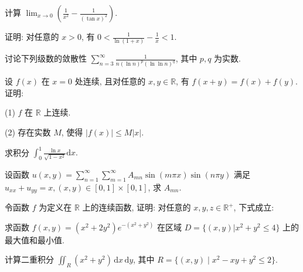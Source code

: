 计算 $\lim_{x\to 0}\left(\frac{1}{x^2} -\frac{1}{(\tan x)^2}\right)$.\par
证明: 对任意的 $x > 0$, 有 $0 < \frac{1}{\ln(1 + x)} - \frac{1}{x} < 1$.\par
讨论下列级数的敛散性 $\sum_{n=3}^{\infty} \frac{1}{n(\ln n)^p (\ln \ln n)^q}$, 其中 $p, q$ 为实数.\par
设 $f(x)$ 在 $x = 0$ 处连续, 且对任意的 $x, y \in \mathbb{R}$, 有 $f(x + y) = f(x) + f(y)$. 证明:\par
(1) $f$ 在 $\mathbb{R}$ 上连续.\par
(2) 存在实数 $M$, 使得 $|f(x)| \leq M|x|$.\par
求积分 $\int_0^1\frac{\ln x}{\sqrt{1 - x^2}}\mathrm{d}x.$\par
设函数 $u(x, y) = \sum_{n=1}^{\infty} \sum_{m=1}^{\infty} A_{mn} \sin(m\pi x) \sin(n\pi y)$ 满足 $u_{xx} + u_{yy} = x, (x, y) \in [0, 1] \times [0, 1]$, 求 $A_{mn}$.\par
\par{}
令函数 $f$ 为定义在 $\mathbb{R}$ 上的连续函数, 证明: 对任意的 $x, y, z \in \mathbb{R}^{+}$, 下式成立:\par
\nopagebreak[4]
求函数 $f(x, y) = (x^2 + 2y^2)e^{-(x^2 + y^2)}$ 在区域 $D = \{(x, y) | x^2 + y^2 \leq 4\}$ 上的最大值和最小值.\par
计算二重积分 $\iint_{R} (x^{2} + y^{2}) \, \mathrm{d}x \, \mathrm{d}y$, 其中 $R = \{(x, y) \mid x^{2} - xy + y^{2} \leq 2\}$.\par
